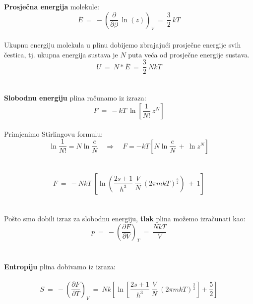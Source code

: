 \documentclass[a4paper,12pt]{article}
\begin{document}
\newpage
\textbf{Prosje\v{c}na energija} molekule:
\\
$$ \overline{E}\ =\ -\left( \frac{\partial}{\partial \beta}\ \ln(z) \right)_V\ =\ \frac{3}{2}\ kT $$ 
\\
Ukupnu energiju molekula u plinu dobijemo zbrajaju\'{c}i prosje\v{c}ne energije svih \v{c}estica, tj. ukupna energija sustava je $N$ puta ve\'ca od 
prosje\v{c}ne energije sustava.
\\
$$ U\ =\ N*\overline{E}\ =\ \frac{3}{2}\ NkT $$
\\
\\
\textbf{Slobodnu energiju} plina ra\v{c}unamo iz izraza:
\\
$$ F\ =\ -kT\ \ln{\left[ \frac{1}{N!}\ z^N \right]}  $$
\\
Primjenimo Stirlingovu formulu:
\\
$$ \ln{\frac{1}{N!}} = N\ln{\frac{e}{N}} \quad \Rightarrow \quad F = -kT \left[N\ln{\frac{e}{N}}\ +\ \ln{z^N} \right] $$
\\
\\
$$ F\ =\ -NkT\ \left[ \ln{\left( \frac{2s+1}{h^3}\ \frac{V}{N}\ \left( 2\pi mkT   \right)^{\frac{3}{2}}  \right)}\ +\ 1 \right] $$
\\
\\
Po\v{s}to smo dobili izraz za slobodnu energiju, \textbf{tlak} plina mo\v{z}emo izra\v{c}unati kao:
\\
$$ p\ =\ -\left( \frac{\partial F}{\partial V} \right)_T\ =\ \frac{NkT}{V} $$
\\
\\
\textbf{Entropiju} plina dobivamo iz izraza:
\\
\\
$$ S\ =\ -\left( \frac{\partial F}{\partial T} \right)_V\ =\ Nk\left[\ln{\left[\frac{2s+1}{h^3}\ \frac{V}{N}\ \left(2\pi mkT\right)^{\frac{3}{2}}\right]}+\frac{5}{2}\right] $$
\end{document}
